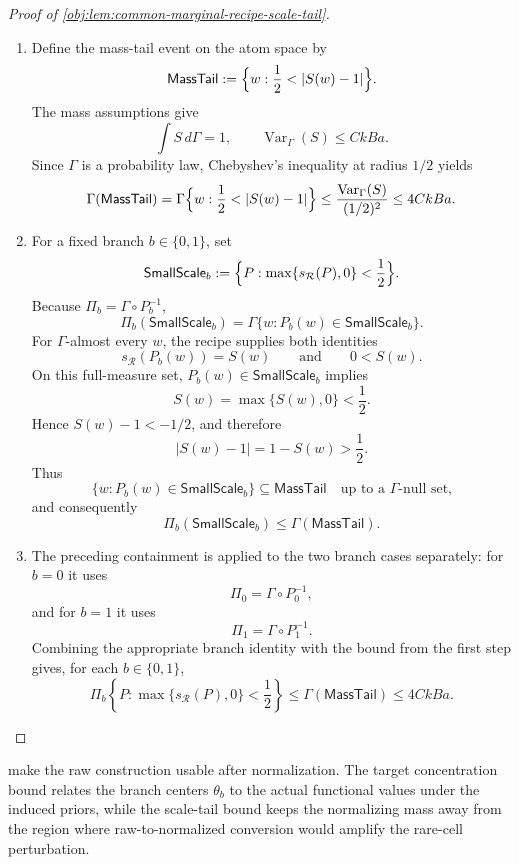 \documentclass[11pt]{article}
\begin{document}
\begin{proof}[Proof of \cref{obj:lem:common-marginal-recipe-scale-tail}]
\begin{enumerate}
\item Define the mass-tail event on the atom space by
\[
\mathsf{MassTail}
:=
\Bigl\{w:\frac12<|S(w)-1|\Bigr\}.
\]
The mass assumptions give
\[
\int S\,d\Gamma=1,
\qquad
\operatorname{Var}_{\Gamma}(S)\le CkBa.
\]
Since \(\Gamma\) is a probability law, Chebyshev's inequality at radius \(1/2\) yields
\[
\Gamma(\mathsf{MassTail})
=
\Gamma\Bigl\{w:\frac12<|S(w)-1|\Bigr\}
\le
\frac{\operatorname{Var}_{\Gamma}(S)}{(1/2)^2}
\le
4CkBa .
\]

\item For a fixed branch \(b\in\{0,1\}\), set
\[
\mathsf{SmallScale}_b
:=
\Bigl\{P:\max\{s_{\mathcal R}(P),0\}<\frac12\Bigr\}.
\]
Because \(\Pi_b=\Gamma\circ P_b^{-1}\),
\[
\Pi_b(\mathsf{SmallScale}_b)
=
\Gamma\{w:P_b(w)\in\mathsf{SmallScale}_b\}.
\]
For \(\Gamma\)-almost every \(w\), the recipe supplies both identities
\[
s_{\mathcal R}(P_b(w))=S(w)
\qquad\text{and}\qquad
0<S(w).
\]
On this full-measure set, \(P_b(w)\in\mathsf{SmallScale}_b\) implies
\[
S(w)=\max\{S(w),0\}<\frac12.
\]
Hence \(S(w)-1<-1/2\), and therefore
\[
|S(w)-1|=1-S(w)>\frac12.
\]
Thus
\[
\{w:P_b(w)\in\mathsf{SmallScale}_b\}
\subseteq \mathsf{MassTail}
\quad\text{up to a \(\Gamma\)-null set,}
\]
and consequently
\[
\Pi_b(\mathsf{SmallScale}_b)\le \Gamma(\mathsf{MassTail}).
\]

\item The preceding containment is applied to the two branch cases separately: for \(b=0\) it uses
\[
\Pi_0=\Gamma\circ P_0^{-1},
\]
and for \(b=1\) it uses
\[
\Pi_1=\Gamma\circ P_1^{-1}.
\]
Combining the appropriate branch identity with the bound from the first step gives, for each
\(b\in\{0,1\}\),
\[
\Pi_b\!\left\{P:\max\{s_{\mathcal R}(P),0\}<\frac12\right\}
\le
\Gamma(\mathsf{MassTail})
\le
4CkBa .
\]
\end{enumerate}
\end{proof}

 make the raw construction usable after normalization. The target concentration bound relates the branch centers \(\theta_b\) to the actual functional values under the induced priors, while the scale-tail bound keeps the normalizing mass away from the region where raw-to-normalized conversion would amplify the rare-cell perturbation.
\end{document}
